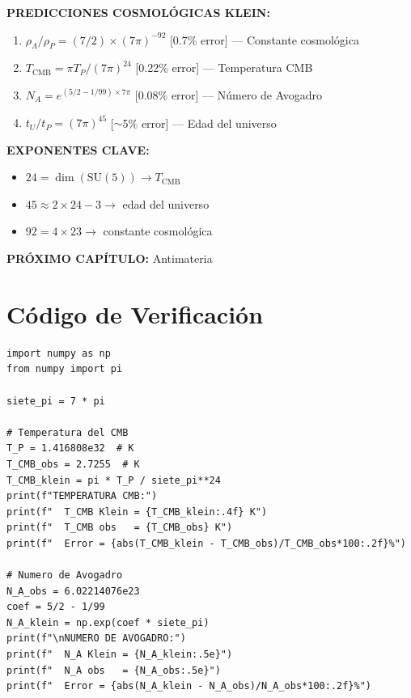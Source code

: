 \begin{tcolorbox}[colback=kleingray, colframe=kleinblue, title=\textbf{Resumen del Capítulo 6}]

\textbf{PREDICCIONES COSMOLÓGICAS KLEIN:}

\begin{enumerate}
    \item $\rho_\Lambda/\rho_P = (7/2) \times (7\pi)^{-92}$ \hfill [0.7\% error] --- Constante cosmológica
    \item $T_{\text{CMB}} = \pi T_P / (7\pi)^{24}$ \hfill [0.22\% error] --- Temperatura CMB
    \item $N_A = e^{(5/2-1/99) \times 7\pi}$ \hfill [0.08\% error] --- Número de Avogadro
    \item $t_U/t_P = (7\pi)^{45}$ \hfill [$\sim$5\% error] --- Edad del universo
\end{enumerate}

\vspace{0.3cm}
\textbf{EXPONENTES CLAVE:}
\begin{itemize}
    \item $24 = \dim(\text{SU}(5)) \to T_{\text{CMB}}$
    \item $45 \approx 2 \times 24 - 3 \to$ edad del universo
    \item $92 = 4 \times 23 \to$ constante cosmológica
\end{itemize}

\vspace{0.3cm}
\textbf{PRÓXIMO CAPÍTULO:} Antimateria

\end{tcolorbox}


\section*{Código de Verificación}

\begin{lstlisting}[caption={Verificación numérica - Capítulo 6}]
import numpy as np
from numpy import pi

siete_pi = 7 * pi

# Temperatura del CMB
T_P = 1.416808e32  # K
T_CMB_obs = 2.7255  # K
T_CMB_klein = pi * T_P / siete_pi**24
print(f"TEMPERATURA CMB:")
print(f"  T_CMB Klein = {T_CMB_klein:.4f} K")
print(f"  T_CMB obs   = {T_CMB_obs} K")
print(f"  Error = {abs(T_CMB_klein - T_CMB_obs)/T_CMB_obs*100:.2f}%")

# Numero de Avogadro
N_A_obs = 6.02214076e23
coef = 5/2 - 1/99
N_A_klein = np.exp(coef * siete_pi)
print(f"\nNUMERO DE AVOGADRO:")
print(f"  N_A Klein = {N_A_klein:.5e}")
print(f"  N_A obs   = {N_A_obs:.5e}")
print(f"  Error = {abs(N_A_klein - N_A_obs)/N_A_obs*100:.2f}%")
\end{lstlisting}
